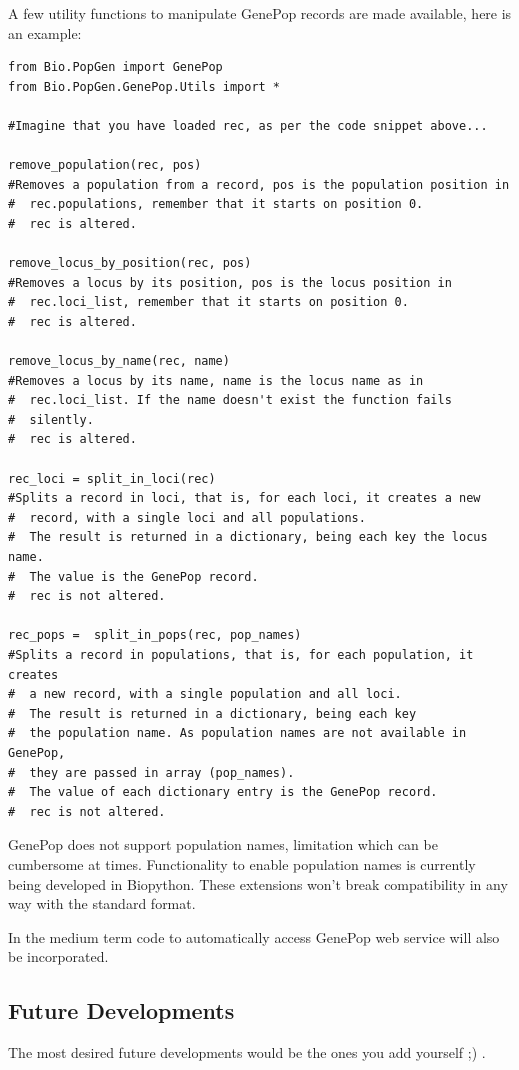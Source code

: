 \documentclass{report}
\begin{document}
A few utility functions to manipulate GenePop records are made
available, here is an example:


\begin{verbatim}
from Bio.PopGen import GenePop
from Bio.PopGen.GenePop.Utils import *

#Imagine that you have loaded rec, as per the code snippet above...

remove_population(rec, pos)
#Removes a population from a record, pos is the population position in
#  rec.populations, remember that it starts on position 0.
#  rec is altered.

remove_locus_by_position(rec, pos)
#Removes a locus by its position, pos is the locus position in
#  rec.loci_list, remember that it starts on position 0.
#  rec is altered.

remove_locus_by_name(rec, name)
#Removes a locus by its name, name is the locus name as in
#  rec.loci_list. If the name doesn't exist the function fails
#  silently.
#  rec is altered.

rec_loci = split_in_loci(rec)
#Splits a record in loci, that is, for each loci, it creates a new
#  record, with a single loci and all populations.
#  The result is returned in a dictionary, being each key the locus name.
#  The value is the GenePop record.
#  rec is not altered.

rec_pops =  split_in_pops(rec, pop_names)
#Splits a record in populations, that is, for each population, it creates
#  a new record, with a single population and all loci.
#  The result is returned in a dictionary, being each key
#  the population name. As population names are not available in GenePop,
#  they are passed in array (pop_names).
#  The value of each dictionary entry is the GenePop record.
#  rec is not altered.
\end{verbatim}

GenePop does not support population names, limitation which can be
cumbersome at times.
Functionality to enable population names is currently being developed in
Biopython. These
extensions won't break compatibility in any way with the standard format.

In
the medium term code to automatically access GenePop web service will also be
incorporated.

\subsection{Future Developments}

The most desired future developments would be the ones you add yourself ;) .
\end{document}
